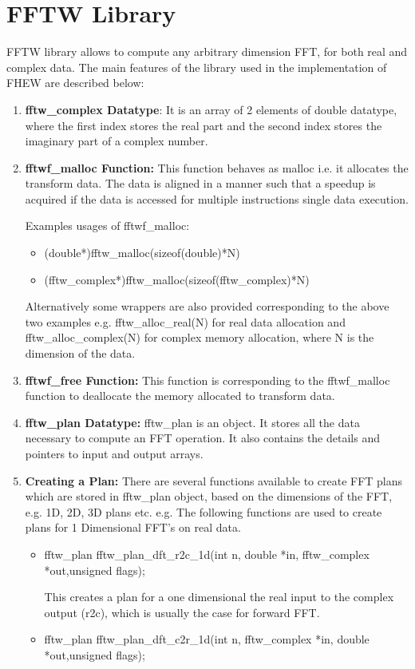 \section{FFTW Library}
FFTW library allows to compute any arbitrary dimension FFT, for both real and complex data. The main features of the library used in the implementation of FHEW are described below:
\begin{enumerate}
\item
\textbf{fftw\_complex Datatype}: It is an array of 2 elements of double datatype, where the first index stores the real part and the second index stores the imaginary part of a complex number.
\item
\textbf{fftwf\_malloc Function:} This function behaves as malloc i.e. it allocates the transform data. The data is aligned in a manner such that a speedup is acquired if the data is accessed for multiple instructions single data execution.

\noindent Examples usages of fftwf\_malloc:
\begin{itemize}
\item
(double*)fftw\_malloc(sizeof(double)*N)
\item
(fftw\_complex*)fftw\_malloc(sizeof(fftw\_complex)*N)
\end{itemize}
Alternatively some wrappers are also provided corresponding to the above two examples e.g. fftw\_alloc\_real(N) for real data allocation and fftw\_alloc\_complex(N) for complex memory allocation, where N is the dimension of the data.
\item
\textbf{fftwf\_free Function:} This function is corresponding to the fftwf\_malloc function to deallocate the memory allocated to transform data.
\item
\textbf{fftw\_plan Datatype:} fftw\_plan is an object. It stores all the data necessary to compute an FFT operation. It also contains the details and pointers to input and output arrays. 
\item
\textbf{Creating a Plan:} There are several functions available to create FFT plans which are stored in fftw\_plan object, based on the dimensions of the FFT, e.g. 1D, 2D, 3D plans etc.
e.g. The following functions are used to create plans for 1 Dimensional FFT's on real data. 
\begin{itemize}
\item
fftw\_plan fftw\_plan\_dft\_r2c\_1d(int n, double *in, fftw\_complex *out,unsigned flags);

This creates a plan for a one dimensional the real input to the complex output (r2c), which is usually the case for forward FFT.
\vspace{0.25cm}
\item
fftw\_plan fftw\_plan\_dft\_c2r\_1d(int n, fftw\_complex *in, double *out,unsigned flags);


\end{itemize}
\end{enumerate}
